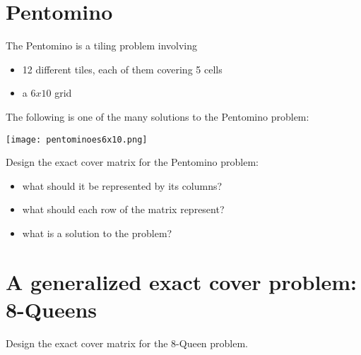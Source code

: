 \documentclass[table]{article}
\begin{document}
\vspace{1em}
\section{Pentomino}

The Pentomino is a tiling problem involving
\begin{itemize}
\item 12 different tiles, each of them covering 5 cells
\item a $6x10$ grid
\end{itemize}

The following is one of the many solutions to the Pentomino problem:
\vspace{1em}

\begin{center}
\texttt{[image: pentominoes6x10.png]}
\end{center}

\vspace{1em}

Design the exact cover matrix for the Pentomino problem:
\begin{itemize}
	\item what should it be represented by its columns?
	\item what should each row of the matrix represent?
	\item what is a solution to the problem?
\end{itemize}

\section{A generalized exact cover problem: 8-Queens}

Design the exact cover matrix for the 8-Queen problem.
\end{document}
